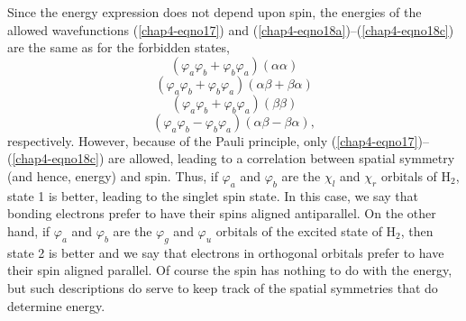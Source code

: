 Since the energy expression does not depend upon spin, the energies of
the allowed wavefunctions (\ref{chap4-eqno17}) and
(\ref{chap4-eqno18a})--(\ref{chap4-eqno18c}) are the same as for the
forbidden states,
\begin{equation}
\left( \varphi_a \varphi_b + \varphi_b \varphi_a \right)\left( \alpha 
\alpha \right)
\end{equation}
\begin{equation}
\left( \varphi_a \varphi_b + \varphi_b \varphi_a \right)\left( \alpha 
\beta + \beta \alpha \right)
\end{equation}
\begin{equation}
\left( \varphi_a \varphi_b + \varphi_b \varphi_a \right)\left( \beta 
\beta \right)
\end{equation}
\begin{equation}
\left( \varphi_a \varphi_b - \varphi_b \varphi_a \right) \left( \alpha 
\beta - \beta \alpha \right) ,
\label{chap4-eqno19}
\end{equation}
respectively.  However, because of the Pauli principle, only
(\ref{chap4-eqno17})--(\ref{chap4-eqno18c}) are allowed, leading to
a correlation between spatial symmetry (and hence, energy) and spin.
Thus, if $\varphi_a$ and $\varphi_b$ are the $\chi_l$ and $\chi_r$
orbitals of H$_2$, state 1 is better, leading to the singlet spin
state.  In this case, we say that bonding electrons prefer to have
their spins aligned antiparallel.  On the other hand, if $\varphi_a$
and $\varphi_b$ are the $\varphi_g$ and $\varphi_u$ orbitals of the
excited state of H$_2$, then state 2 is better and we say that
electrons in orthogonal orbitals prefer to have their spin aligned
parallel.  Of course the spin has nothing to do with the energy, but
such descriptions do serve to keep track of the spatial symmetries
that do determine energy.

